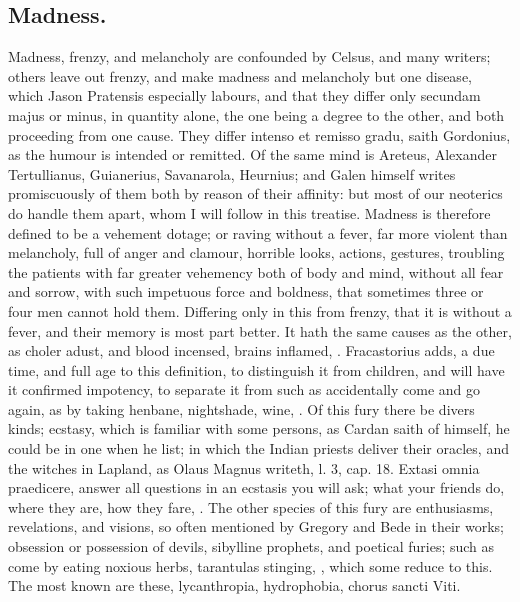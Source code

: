 {\subsection{Madness.}
Madness, frenzy, and melancholy are confounded by Celsus,
and many writers; others leave out frenzy, and make madness and
melancholy but one disease, which Jason Pratensis especially
labours, and that they differ only secundam majus or minus, in quantity
alone, the one being a degree to the other, and both proceeding from
one cause. They differ intenso et remisso gradu, saith Gordonius,
as the humour is intended or remitted. Of the same mind is
Areteus, Alexander Tertullianus, Guianerius, Savanarola, Heurnius;
and Galen himself writes promiscuously of them both by reason of their
affinity: but most of our neoterics do handle them apart, whom I will
follow in this treatise. Madness is therefore defined to be a vehement
dotage; or raving without a fever, far more violent than melancholy,
full of anger and clamour, horrible looks, actions, gestures, troubling
the patients with far greater vehemency both of body and mind, without
all fear and sorrow, with such impetuous force and boldness, that
sometimes three or four men cannot hold them. Differing only in this
from frenzy, that it is without a fever, and their memory is most part
better. It hath the same causes as the other, as choler adust, and
blood incensed, brains inflamed, \etc{}. Fracastorius adds, a due
time, and full age to this definition, to distinguish it from children,
and will have it confirmed impotency, to separate it from such as
accidentally come and go again, as by taking henbane, nightshade, wine,
\etc{}. Of this fury there be divers kinds; ecstasy, which is familiar
with some persons, as Cardan saith of himself, he could be in one when
he list; in which the Indian priests deliver their oracles, and the
witches in Lapland, as Olaus Magnus writeth, l. 3, cap. 18. Extasi
omnia praedicere, answer all questions in an ecstasis you will ask;
what your friends do, where they are, how they fare, \etc{}. The other
species of this fury are enthusiasms, revelations, and visions, so
often mentioned by Gregory and Bede in their works; obsession or
possession of devils, sibylline prophets, and poetical furies; such as
come by eating noxious herbs, tarantulas stinging, \etc{}, which some
reduce to this. The most known are these, lycanthropia, hydrophobia,
chorus sancti Viti.

}
